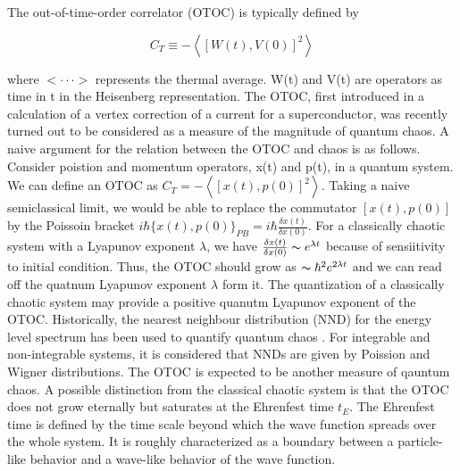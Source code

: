 \documentclass[12pt, letterpaper]{article}
\newcommand*{\1}{\hspace{1pt}}
\begin{document}
\begin{mdframed}[hidealllines=true,backgroundcolor=blue!20]
    The out-of-time-order correlator (OTOC) is typically defined by \cite{s11}

    \begin{equation}
        C_{T} \equiv  - \left\langle\left[W(t),V(0)\right]^{2}\right\rangle
    \end{equation}

    where $<\cdot \cdot \cdot >$ represents the thermal average. W(t) and V(t) are operators as time in t in the Heisenberg representation. The OTOC, first introduced
    in a calculation of a vertex correction of a current for a superconductor\cite{s12}, was recently turned out to be considered as a measure of the magnitude of 
    quantum chaos. A naive argument for the relation between the OTOC and chaos is as follows\cite{s13}. Consider poistion and momentum operators, x(t) and p(t), in a
    quantum system. We can define an OTOC as $C_{T} = - \left\langle\left[x(t),p(0)\right]^{2}\right\rangle$. Taking a naive semiclassical limit, we would be able to 
    replace the commutator $\left[x(t),p(0)\right]$ by the Poissoin bracket $i\hbar\{x(t),p(0)\}_{PB} = i\hbar\frac{\delta x(t)}{\delta x(0)}$. For a classically 
    chaotic system with a Lyapunov exponent $\lambda$, we have $\frac{\delta x(t)}{\delta x(0)}\thicksim  e^{\lambda t}$ because of sensiitivity to initial condition.
    Thus, the OTOC should grow as $\thicksim \hbar^{2}e^{2\lambda t}$ and we can read off the quatnum Lyapunov exponent $\lambda$ form it. The quantization of a 
    classically chaotic system may provide a positive quanutm Lyapunov exponent of the OTOC. Historically, the nearest neighbour distribution (NND) for the energy
    level spectrum has been used to quantify quantum chaos \cite{s14}. For integrable and non-integrable systems, it is considered that NNDs are given by Poission
    and Wigner distributions. The OTOC is expected to be another measure of qauntum chaos. A possible distinction from the classical chaotic system is that the 
    OTOC does not grow eternally but saturates at the Ehrenfest time $t_{E}$. The Ehrenfest time is defined by the time scale beyond which the wave function spreads
    over the whole system. It is roughly characterized as a boundary between a particle-like behavior and a wave-like behavior of the wave function.


\end{mdframed}
\end{document}

